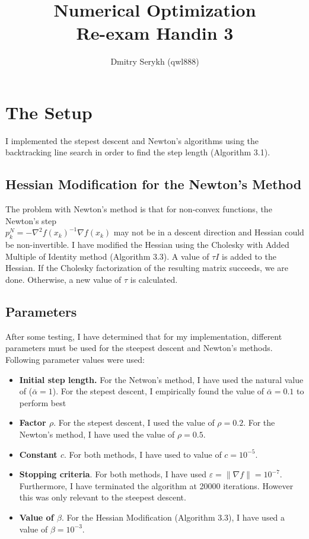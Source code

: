 \documentclass[a4paper]{article}
\title{\vspace{-5cm} Numerical Optimization \\ Re-exam Handin 3}
\author{Dmitry Serykh (qwl888)}
\begin{document}
\maketitle
\section{The Setup}
I implemented the stepest descent and Newton's algorithms using the
backtracking line search in order to find the step length (Algorithm 3.1).

\subsection{Hessian Modification for the Newton's Method}
The problem with Newton's method is that for non-convex functions, the Newton's step\\
$p_k^{N} = -\nabla^2 f(x_k)^{-1} \nabla f(x_k)$ may not be in a descent direction and Hessian could
be non-invertible. I have modified the Hessian using the Cholesky with Added
Multiple of Identity method (Algorithm 3.3). A value of $\tau I$ is added to the
Hessian. If the Cholesky factorization of the resulting matrix succeeds, we are done.
Otherwise, a new value of $\tau$ is calculated.

\subsection{Parameters}
After some testing, I have determined that for my implementation, different
parameters must be used for the steepest descent and Newton's methods.
Following parameter values were used:

\begin{itemize}
\item \textbf{Initial step length.} For the Netwon's method, I have used the natural
  value of ($\bar{\alpha}=1$). For the stepest descent, I empirically found the value
  of $\bar{\alpha} = 0.1$  to perform best
\item \textbf{Factor $\rho$}. For the stepest descent, I used the value of
  $\rho = 0.2$. For the Newton's method, I have used the value of $\rho=0.5$.
\item \textbf{Constant $c$}. For both methods, I have used to value of $c=10^{-5}$.
\item \textbf{Stopping criteria}. For both methods, I have used
  $\varepsilon = \| \nabla f\| = 10^{-7}$. Furthermore, I have terminated the
  algorithm at 20000 iterations. However this was only relevant to the steepest descent.
\item \textbf{Value of $\beta$}. For the Hessian Modification (Algorithm 3.3), I
  have used a value of $\beta=10^{-3}$.
\end{itemize}
\end{document}
